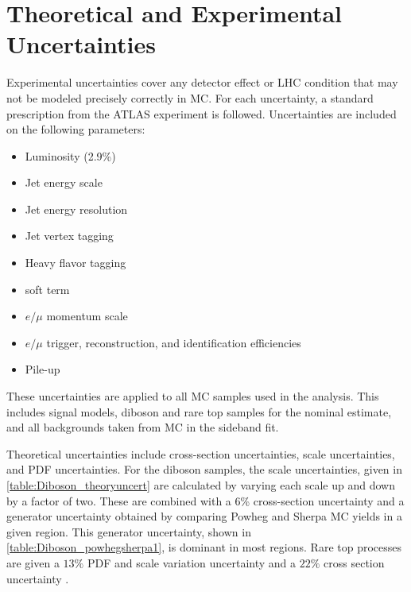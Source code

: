 
\section{Theoretical and Experimental Uncertainties}

Experimental uncertainties cover any detector effect or \ac{LHC} condition that may not be modeled precisely correctly in \ac{MC}. For each uncertainty, a standard prescription from the ATLAS experiment is followed. Uncertainties are included on the following parameters:  
\begin{itemize}
\item Luminosity (2.9\%) \cite{2011lumi,2012lumi}
\item Jet energy scale \cite{ATL-PHYS-PUB-2015-015}
\item Jet energy resolution \cite{ATL-PHYS-PUB-2015-015}
\item Jet vertex tagging
\item Heavy flavor tagging
\item \met soft term \cite{ATL-PHYS-PUB-2015-023}
\item $e/\mu$ momentum scale  
\item $e/\mu$ trigger, reconstruction, and identification efficiencies
\item Pile-up
\end{itemize}

These uncertainties are applied to all \ac{MC} samples used in the analysis. This includes signal models, diboson and rare top samples for the nominal estimate, and all backgrounds taken from \ac{MC} in the sideband fit. 

Theoretical uncertainties include cross-section uncertainties, scale uncertainties, and \ac{PDF} uncertainties. For the diboson samples, the scale uncertainties, given in \autoref{table:Diboson_theoryuncert} are calculated by varying each scale up and down by a factor of two. These are combined with a 6\% cross-section uncertainty and a generator uncertainty obtained by comparing {\sc Powheg} and {\sc Sherpa} \ac{MC} yields in a given region. This generator uncertainty, shown in \autoref{table:Diboson_powhegsherpa1}, is dominant in most regions. Rare top processes are given a $13\%$ PDF and scale variation uncertainty \cite{Alwall:2014hca} and a $22\%$ cross section uncertainty \cite{Campbell:2012,Lazopoulos:2008,Garzelli:2012bn}. 

